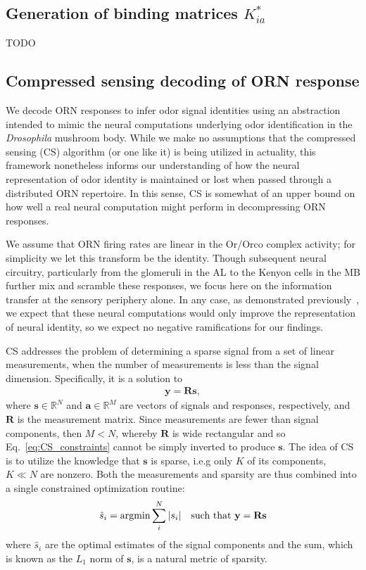 \documentclass[9pt,twocolumn,twoside,lineno]{pnas-new}
\begin{document}
\subsection{Generation of binding matrices $K^*_{ia}$}
TODO

\subsection{Compressed sensing decoding of ORN response}
We decode ORN responses to infer odor signal identities using an abstraction intended to mimic the neural computations underlying odor identification in the \textit{Drosophila} mushroom body. While we make no assumptions that the compressed sensing (CS) algorithm (or one like it) is being utilized in actuality, this framework nonetheless informs our understanding of how the neural representation of odor identity is maintained or lost when passed through a distributed ORN repertoire. In this sense, CS is somewhat of an upper bound on how well a real neural computation might perform in decompressing ORN responses.

We assume that ORN firing rates are linear in the Or/Orco complex activity; for simplicity we let this transform be the identity. Though subsequent neural circuitry, particularly from the glomeruli in the AL to the Kenyon cells in the MB further mix and scramble these responses, we focus here on the information transfer at the sensory periphery alone. In any case, as demonstrated previously~\cite{vijay_1}, we expect that these neural computations would only improve the representation of neural identity, so we expect no negative ramifications for our findings.

CS addresses the problem of determining a sparse signal from a set of linear measurements, when the number of measurements is less than the signal dimension. Specifically, it is a solution to 
\begin{align}
\mathbf y = \mathbf R\mathbf s,
\label{eq:CS_constraints}
\end{align} where $\mathbf s \in \mathbb{R}^N$ and $\mathbf a\in \mathbb{R}^M$ are vectors of signals and responses, respectively, and $\mathbf R$ is the measurement matrix. Since measurements are fewer than signal components, then $M < N$, whereby $\mathbf R$ is wide rectangular and so Eq.~\ref{eq:CS_constraints} cannot be simply inverted to produce $\mathbf s$. The idea of CS is to utilize the knowledge that $\mathbf s$ is sparse, i.e.g only $K$ of its components, $K \ll N$ are nonzero. Both the measurements and sparsity are thus combined into a single constrained optimization routine:
\begin{align}
\hat s_i = \textup{argmin} \sum_i^N |s_i| \quad \textup{such that } \mathbf y = \mathbf R\mathbf s
\label{eq:CS}
\end{align}
where $\hat s_i$ are the optimal estimates of the signal components and the sum, which is known as the $L_1$ norm of $\mathbf s$, is a natural metric of sparsity. 
\end{document}
